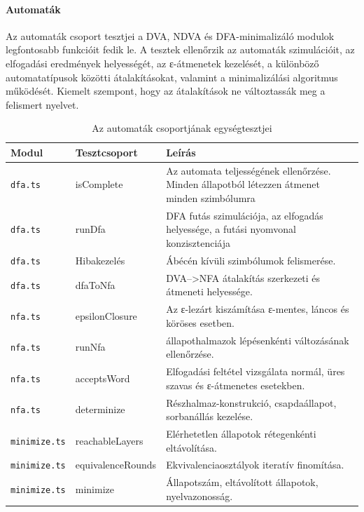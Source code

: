 \paragraph{Automaták}
Az automaták csoport tesztjei a DVA, NDVA és DFA-minimalizáló modulok 
legfontosabb funkcióit fedik le. A tesztek ellenőrzik az automaták szimulációit, 
az elfogadási eredmények helyességét, az ε-átmenetek kezelését, a különböző
automatatípusok közötti átalakításokat, valamint a minimalizálási algoritmus 
működését.
Kiemelt szempont, hogy az átalakítások ne változtassák meg a felismert nyelvet.
\begin{table}[H]
    \centering
    \begin{tabularx}{\textwidth}{|l|l|X|}
        \hline
        \textbf{Modul} & \textbf{Tesztcsoport} & \textbf{Leírás} \\ \hline
        \texttt{dfa.ts} & isComplete & Az automata teljességének ellenőrzése. Minden állapotból létezzen átmenet minden szimbólumra \\ \hline
        \texttt{dfa.ts} & runDfa & DFA futás szimulációja, az elfogadás helyessége, a futási nyomvonal konzisztenciája \\ \hline
        \texttt{dfa.ts} & Hibakezelés & Ábécén kívüli szimbólumok felismerése. \\ \hline
        \texttt{dfa.ts} & dfaToNfa & DVA-->NFA átalakítás szerkezeti és átmeneti helyessége. \\ \hline
        \texttt{nfa.ts} & epsilonClosure & Az ε-lezárt kiszámítása ε-mentes, láncos és köröses esetben. \\ \hline
        \texttt{nfa.ts} & runNfa & állapothalmazok lépésenkénti változásának ellenőrzése. \\ \hline
        \texttt{nfa.ts} & acceptsWord & Elfogadási feltétel vizsgálata normál, üres szavas és ε-átmenetes esetekben. \\ \hline
        \texttt{nfa.ts} & determinize & Részhalmaz-konstrukció, csapdaállapot, sorbanállás kezelése. \\ \hline
        \texttt{minimize.ts} & reachableLayers & Elérhetetlen állapotok rétegenkénti eltávolítása. \\ \hline
        \texttt{minimize.ts} & equivalenceRounds & Ekvivalenciaosztályok iteratív finomítása. \\ \hline
        \texttt{minimize.ts} & minimize & Állapotszám, eltávolított állapotok, nyelvazonosság. \\ \hline
    \end{tabularx}
    \caption{Az automaták csoportjának egységtesztjei}
    \label{tab:test_automata}
\end{table}

